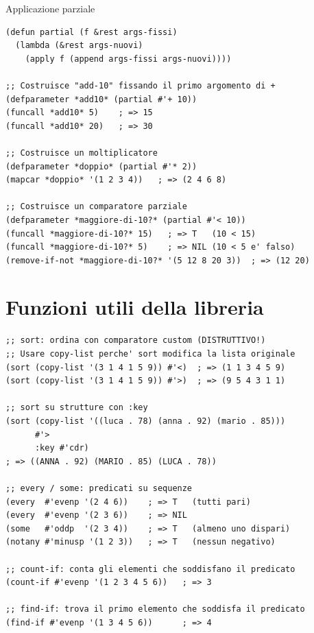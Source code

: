 \begin{concetto}{Applicazione parziale}

\boxsep
{}
\end{concetto}

\begin{esempio}
\begin{lstlisting}
(defun partial (f &rest args-fissi)
  (lambda (&rest args-nuovi)
    (apply f (append args-fissi args-nuovi))))

;; Costruisce "add-10" fissando il primo argomento di +
(defparameter *add10* (partial #'+ 10))
(funcall *add10* 5)    ; => 15
(funcall *add10* 20)   ; => 30

;; Costruisce un moltiplicatore
(defparameter *doppio* (partial #'* 2))
(mapcar *doppio* '(1 2 3 4))   ; => (2 4 6 8)

;; Costruisce un comparatore parziale
(defparameter *maggiore-di-10?* (partial #'< 10))
(funcall *maggiore-di-10?* 15)   ; => T   (10 < 15)
(funcall *maggiore-di-10?* 5)    ; => NIL (10 < 5 e' falso)
(remove-if-not *maggiore-di-10?* '(5 12 8 20 3))  ; => (12 20)
\end{lstlisting}
\end{esempio}

\section{Funzioni utili della libreria}

\begin{esempio}
\begin{lstlisting}
;; sort: ordina con comparatore custom (DISTRUTTIVO!)
;; Usare copy-list perche' sort modifica la lista originale
(sort (copy-list '(3 1 4 1 5 9)) #'<)  ; => (1 1 3 4 5 9)
(sort (copy-list '(3 1 4 1 5 9)) #'>)  ; => (9 5 4 3 1 1)

;; sort su strutture con :key
(sort (copy-list '((luca . 78) (anna . 92) (mario . 85)))
      #'>
      :key #'cdr)
; => ((ANNA . 92) (MARIO . 85) (LUCA . 78))

;; every / some: predicati su sequenze
(every  #'evenp '(2 4 6))    ; => T   (tutti pari)
(every  #'evenp '(2 3 6))    ; => NIL
(some   #'oddp  '(2 3 4))    ; => T   (almeno uno dispari)
(notany #'minusp '(1 2 3))   ; => T   (nessun negativo)

;; count-if: conta gli elementi che soddisfano il predicato
(count-if #'evenp '(1 2 3 4 5 6))   ; => 3

;; find-if: trova il primo elemento che soddisfa il predicato
(find-if #'evenp '(1 3 4 5 6))      ; => 4
\end{lstlisting}
\end{esempio}

